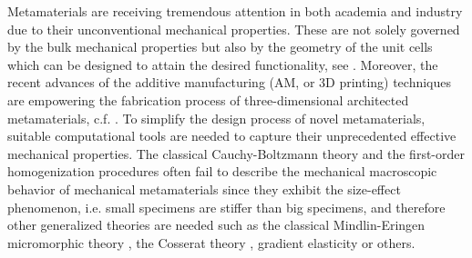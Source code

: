 \label{sec:intor}
 Metamaterials are receiving tremendous attention in both academia and industry due to their unconventional mechanical properties. These are not solely governed by the bulk mechanical properties but also by the geometry of the unit cells which can be designed to attain the desired functionality, see \cite{FisHilEbe:2020:mmo,LeeSinTho:2012:mnm,SurGaoDuLiXioFanLu:2019:AEM,YaZhoLiaJiaWu:2018:mma,Zad:2016:mmm}. Moreover, the recent advances of  the additive manufacturing (AM, or 3D printing) techniques are empowering the fabrication process of three-dimensional architected  metamaterials, c.f. \cite{JiaLi:2018:3pa,MonKuaArnQi:2020:rai,PloPan:2019:rod,LeiHonZhaHamCheLuQi:2019:3po}. To simplify the design process of novel metamaterials, suitable computational tools are needed to capture their unprecedented effective mechanical properties. The classical Cauchy-Boltzmann theory and the first-order homogenization procedures often fail to describe the mechanical macroscopic behavior of mechanical metamaterials since they exhibit the size-effect phenomenon, i.e. small specimens are stiffer than big specimens, and therefore other generalized theories are needed such as the classical Mindlin-Eringen micromorphic theory \cite{Min:1964:msi,SuhEri:1964:nto,EriSub:1964:nto,Eri:1968:mom,LeiMah:2015:coh,LeiMah:2015:tfh}, the Cosserat theory \cite{CosCos:1909:tof,Nef:2006:tcc,NefJeoMueRam:2010:lce}, gradient elasticity  \cite{MinEsh:1968:ofsg,AltAif:1997:osa,FisKlaMerSteMue:2011:iao} or others. 

